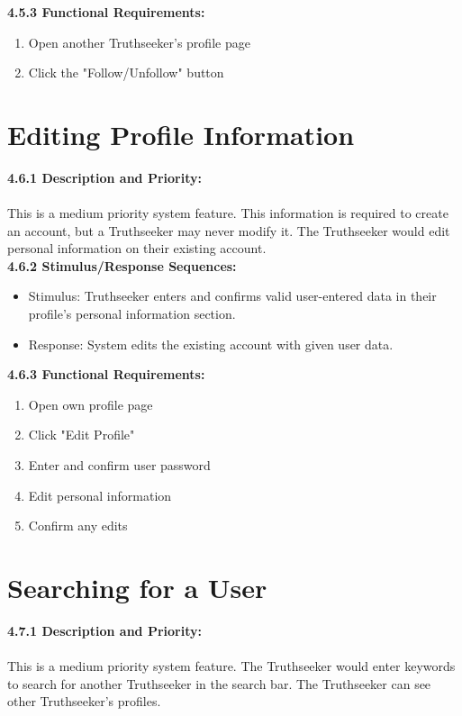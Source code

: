     \quad \textbf{4.5.3 \quad Functional Requirements:}
    \begin{enumerate}
        \item Open another Truthseeker's profile page
        \item Click the "Follow/Unfollow" button
    \end{enumerate}


\section{Editing Profile Information}
    \quad \textbf{4.6.1 \quad Description and Priority:}\\ \\
    \null \quad This is a medium priority system feature. This information is required to create an account, but a Truthseeker may never modify it. The Truthseeker would edit personal information on their existing account. \\
    
    \quad \textbf{4.6.2 \quad Stimulus/Response Sequences:}
    \begin{itemize}
    \item[] Stimulus: \thinspace \quad Truthseeker enters and confirms valid user-entered data in their profile's personal information section.
    \item[] Response: \quad System edits the existing account with given user data.
    \end{itemize}
    
    \quad \textbf{4.6.3 \quad Functional Requirements:}
    \begin{enumerate}
        \item Open own profile page
        \item Click "Edit Profile" 
        \item Enter and confirm user password
        \item Edit personal information
        \item Confirm any edits
    \end{enumerate}


\section{Searching for a User}
    \quad \textbf{4.7.1 \quad Description and Priority:}\\ \\
    \null \quad This is a medium priority system feature. The Truthseeker would enter keywords to search for another Truthseeker in the search bar. The Truthseeker can see other Truthseeker's profiles.\\
    
